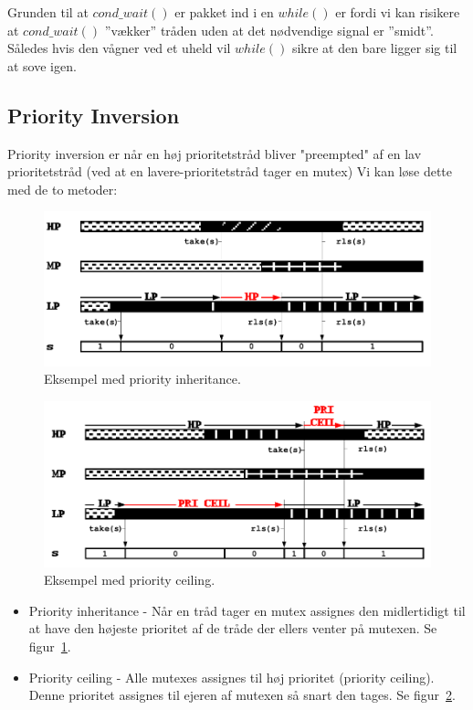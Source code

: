 Grunden til at $cond\_wait()$ er pakket ind i en $while()$ er fordi vi kan risikere at $cond\_wait()$ ''vækker'' tråden uden at det nødvendige signal er ''smidt''. Således hvis den vågner ved et uheld vil $while()$ sikre at den bare ligger sig til at sove igen.\\

\subsection{Priority Inversion}
Priority inversion er når en høj prioritetstråd bliver "preempted" af en lav prioritetstråd (ved at en lavere-prioritetstråd tager en mutex)
Vi kan løse dette med de to metoder:

\begin{figure}[h]
	\centering
	\includegraphics[width=0.7\linewidth]{figs/spm2/inher}
	\caption{Eksempel med priority inheritance.}
	\label{fig:inher}
\end{figure}

\begin{figure}[h]
	\centering
	\includegraphics[width=0.7\linewidth]{figs/spm2/ceili}
	\caption{Eksempel med priority ceiling.}
	\label{fig:ceili}
\end{figure}


\begin{itemize}
	\item Priority inheritance - Når en tråd tager en mutex assignes den midlertidigt til at have den højeste prioritet af de tråde der ellers venter på mutexen. Se figur~\ref{fig:inher}.
	\item Priority ceiling - Alle mutexes assignes til høj prioritet (priority ceiling). Denne prioritet assignes til ejeren af mutexen så snart den tages. Se figur~\ref{fig:ceili}.
\end{itemize}


